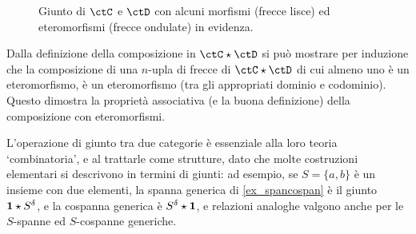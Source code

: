 \begin{definition}
\begin{figure}[h]
\begin{center}
   \caption{Giunto di \(\ctC\) e \(\ctD\) con alcuni morfismi (frecce lisce) ed eteromorfismi (frecce ondulate) in evidenza.}
   \label{fig_giunto}
  \end{center}
 \end{figure}
\end{definition}
Dalla definizione della composizione in \(\ctC\star\ctD\) si può mostrare per induzione che la composizione di una \(n\)-upla di frecce di \(\ctC\star\ctD\) di cui almeno uno è un eteromorfismo, è un eteromorfismo (tra gli appropriati dominio e codominio). Questo dimostra la proprietà associativa (e la buona definizione) della composizione con eteromorfismi.

L'operazione di giunto tra due categorie è essenziale alla loro teoria `combinatoria', e al trattarle come strutture, dato che molte costruzioni elementari si descrivono in termini di giunti: ad esempio, se \(S=\{a,b\}\) è un insieme con due elementi, la spanna generica di \ref{ex_spancospan} è il giunto \(\mathbf{1}\star S^\delta\), e la cospanna generica è \(S^\delta\star\mathbf{1}\), e relazioni analoghe valgono anche per le \(S\)-spanne ed \(S\)-cospanne generiche.

